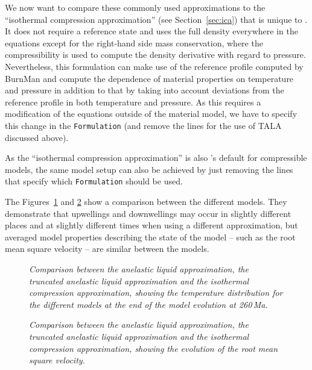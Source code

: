 We now want to compare these commonly used approximations to the ``isothermal compression approximation''
(see Section~\ref{sec:ica}) that is unique to \aspect{}. It does not require a reference state and uses
the full density everywhere in the equations except for the right-hand side  mass conservation, where the
compressibility is used to compute the density derivative with regard to pressure.
Nevertheless, this formulation can make use of the reference profile computed by BurnMan and compute the
dependence of material properties on temperature and pressure in addition to that by taking into account
deviations from the reference profile in both temperature and pressure. As this requires a modification
of the equations outside of the material model, we have to specify this change in the
\texttt{Formulation} (and remove the lines for the use of TALA discussed above).

As the ``isothermal compression approximation'' is also \aspect{}'s default for compressible models,
the same model setup can also be achieved by just removing the lines that specify which \texttt{Formulation}
should be used.

The Figures~\ref{fig:burnman-comparison} and \ref{fig:burnman-vrms} show a comparison between the different
models. They demonstrate that upwellings and downwellings may occur in slightly different places and at
slightly different times when using a different approximation, but averaged model properties describing
the state of the model -- such as the root mean square velocity -- are similar between the models.

\begin{figure}
\centering
  
  \caption{\it Comparison between the anelastic liquid approximation,
               the truncated anelastic liquid approximation
               and the isothermal compression approximation,
               showing the temperature distribution for the different models at
               the end of the model evolution at 260\,Ma.}
  \label{fig:burnman-comparison}
\end{figure}

\begin{figure}
\centering
  
  \caption{\it Comparison between the anelastic liquid approximation,
               the truncated anelastic liquid approximation
               and the isothermal compression approximation,
               showing the evolution of the root mean square velocity.}
  \label{fig:burnman-vrms}
\end{figure}
